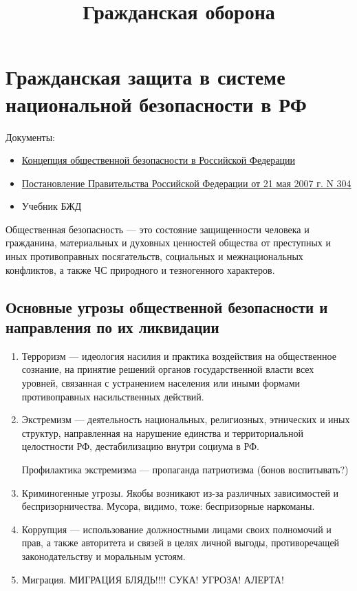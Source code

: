 \documentclass[oneside,final,14pt]{extreport}
\begin{document}
\title{Гражданская оборона}

\maketitle

\chapter*{Гражданская защита в системе национальной безопасности в РФ}
Документы:
\begin{itemize}
	\item \href{http://kremlin.ru/acts/news/19653}{Концепция общественной безопасности в Российской Федерации}
	\item \href{http://www.rg.ru/2007/05/26/chs-dok.html}{Постановление Правительства Российской Федерации от 21 мая 2007 г. N 304}
	\item Учебник БЖД
\end{itemize}

Общественная безопасность --- это состояние защищенности человека и гражданина, материальных и духовных ценностей общества от преступных и иных противоправных посягательств, социальных и межнациональных конфликтов, а также ЧС природного и тезногенного характеров.

\section*{Основные угрозы общественной безопасности и направления по их ликвидации}
\begin{enumerate}
	\item Терроризм --- идеология насилия и практика воздействия на общественное сознание, на принятие решений органов государственной власти всех уровней, связанная с устранением населения или иными формами противоправных насильственных действий.
	\item Экстремизм --- деятельность национальных, религиозных, этнических и иных структур, направленная на нарушение единства и территориальной целостности РФ, дестабилизацию внутри социума в РФ.
	
	Профилактика экстремизма --- пропаганда патриотизма (бонов воспитывать?)
	\item Криминогенные угрозы. Якобы возникают из-за различных зависимостей и беспризорничества. Мусора, видимо, тоже: беспризорные наркоманы.
	\item Коррупция --- использование должностными лицами своих полномочий и прав, а также авторитета и связей в целях личной выгоды, противоречащей законодательству и моральным устоям.
	\item Миграция. МИГРАЦИЯ БЛЯДЬ!!!! СУКА! УГРОЗА! АЛЕРТА!
\end{enumerate}
\end{document}
